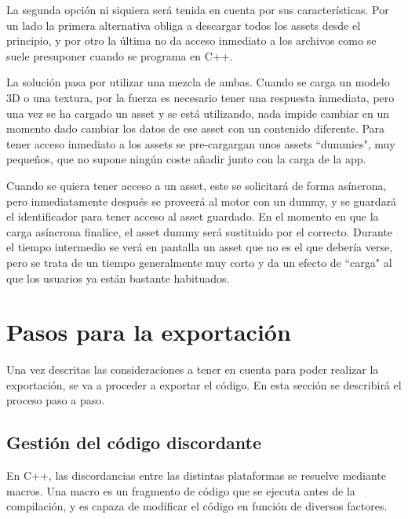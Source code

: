 La segunda opción ni siquiera será tenida en cuenta por sus características. Por un lado la primera alternativa obliga a descargar todos los assets desde el principio, y por otro la última no da acceso inmediato a los archivos como se suele presuponer cuando se programa en C++.

La solución pasa por utilizar una mezcla de ambas. Cuando se carga un modelo 3D o una textura, por la fuerza es necesario tener una respuesta inmediata, pero una vez se ha cargado un asset y se está utilizando, nada impide cambiar en un momento dado cambiar los datos de ese asset con un contenido diferente. Para tener acceso inmediato a los assets se pre-cargargan unos assets ``dummies", muy pequeños, que no supone ningún coste añadir junto con la carga de la app.

Cuando se quiera tener acceso a un asset, este se solicitará de forma asíncrona, pero inmediatamente después se proveerá al motor con un dummy, y se guardará el identificador para tener acceso al asset guardado. En el momento en que la carga asíncrona finalice, el asset dummy será sustituido por el correcto. Durante el tiempo intermedio se verá en pantalla un asset que no es el que debería verse, pero se trata de un tiempo generalmente muy corto y da un efecto de ``carga" al que los usuarios ya están bastante habituados.


\section{Pasos para la exportación}
Una vez descritas las consideraciones a tener en cuenta para poder realizar la exportación, se va a proceder a exportar el código. En esta sección se describirá el proceso paso a paso. 


\subsection{Gestión del código discordante}
\label{cpp_macros_for_platforms}
En C++, las discordancias entre las distintas plataformas se resuelve mediante macros. Una macro es un fragmento de código que se ejecuta antes de la compilación, y es capaza de modificar el código en función de diversos factores. 

